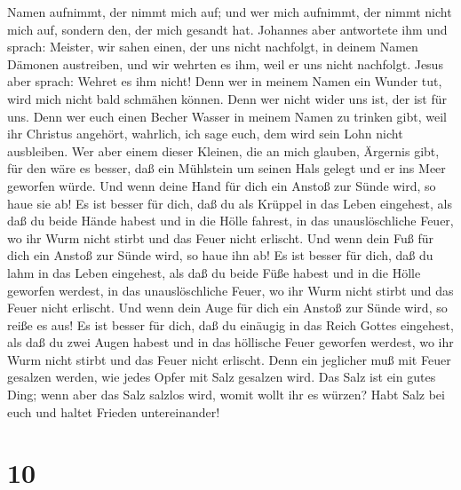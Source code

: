 Namen aufnimmt, der nimmt mich auf; und wer mich aufnimmt, der nimmt
nicht mich auf, sondern den, der mich gesandt hat. 
Johannes aber antwortete ihm und sprach: Meister, wir sahen einen, der
uns nicht nachfolgt, in deinem Namen Dämonen austreiben, und wir wehrten
es ihm, weil er uns nicht nachfolgt.  Jesus aber sprach:
Wehret es ihm nicht! Denn wer in meinem Namen ein Wunder tut, wird mich
nicht bald schmähen können.  Denn wer nicht wider uns
ist, der ist für uns.  Denn wer euch einen Becher Wasser
in meinem Namen zu trinken gibt, weil ihr Christus angehört, wahrlich,
ich sage euch, dem wird sein Lohn nicht ausbleiben.  Wer
aber einem dieser Kleinen, die an mich glauben, Ärgernis gibt, für den
wäre es besser, daß ein Mühlstein um seinen Hals gelegt und er ins Meer
geworfen würde.  Und wenn deine Hand für dich ein Anstoß
zur Sünde wird, so haue sie ab! Es ist besser für dich, daß du als
Krüppel in das Leben eingehest, als daß du beide Hände habest und in die
Hölle fahrest, in das unauslöschliche Feuer,  wo ihr Wurm
nicht stirbt und das Feuer nicht erlischt.  Und wenn dein
Fuß für dich ein Anstoß zur Sünde wird, so haue ihn ab! Es ist besser
für dich, daß du lahm in das Leben eingehest, als daß du beide Füße
habest und in die Hölle geworfen werdest, in das unauslöschliche Feuer,
 wo ihr Wurm nicht stirbt und das Feuer nicht erlischt.
 Und wenn dein Auge für dich ein Anstoß zur Sünde wird,
so reiße es aus! Es ist besser für dich, daß du einäugig in das Reich
Gottes eingehest, als daß du zwei Augen habest und in das höllische
Feuer geworfen werdest,  wo ihr Wurm nicht stirbt und das
Feuer nicht erlischt.  Denn ein jeglicher muß mit Feuer
gesalzen werden, wie jedes Opfer mit Salz gesalzen wird. 
Das Salz ist ein gutes Ding; wenn aber das Salz salzlos wird, womit
wollt ihr es würzen? Habt Salz bei euch und haltet Frieden
untereinander!

\hypertarget{section-9}{%
\section{10}\label{section-9}}

